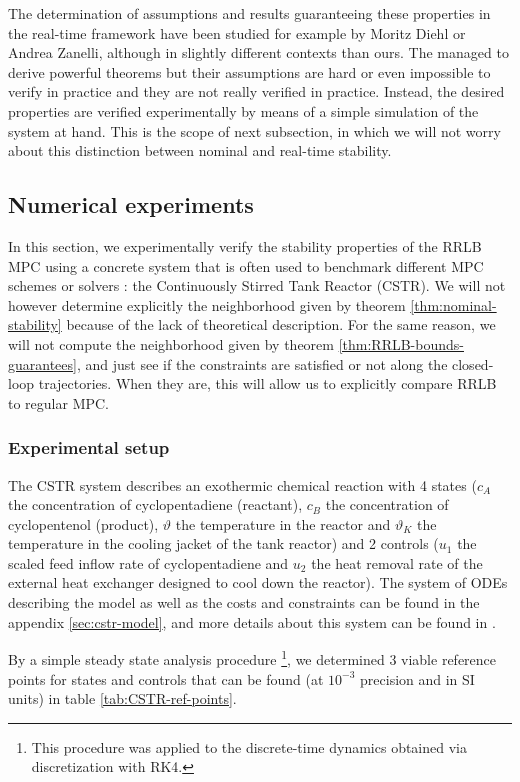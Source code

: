 \documentclass[12pt]{article}
\begin{document}
The determination of assumptions and results guaranteeing these properties in the real-time framework have been studied for example by Moritz Diehl or Andrea Zanelli, although in slightly different contexts than ours.
The managed to derive powerful theorems but their assumptions are hard or even impossible to verify in practice and they are not really verified in practice.
Instead, the desired properties are verified experimentally by means of a simple simulation of the system at hand.
This is the scope of next subsection, in which we will not worry about this distinction between nominal and real-time stability.


\subsection{Numerical experiments}\label{sec:RRLB-numerical-experiments}

In this section, we experimentally verify the stability properties of the RRLB MPC using a concrete system that is often used to benchmark different MPC schemes or solvers : the Continuously Stirred Tank Reactor (CSTR).
We will not however determine explicitly the neighborhood given by theorem \ref{thm:nominal-stability} because of the lack of theoretical description.
For the same reason, we will not compute the neighborhood given by theorem \ref{thm:RRLB-bounds-guarantees}, and just see if the constraints are satisfied or not along the closed-loop trajectories.
When they are, this will allow us to explicitly compare RRLB to regular MPC.

\subsubsection{Experimental setup}

The CSTR system describes an exothermic chemical reaction with 4 states ($c_A$ the concentration of cyclopentadiene (reactant), $c_B$ the concentration of cyclopentenol (product), $\vartheta$ the temperature in the reactor and $\vartheta_K$ the temperature in the cooling jacket of the tank reactor) and 2 controls ($u_1$ the scaled feed inflow rate of cyclopentadiene and $u_2$ the heat removal rate of the external heat exchanger designed to cool down the reactor).
The system of ODEs describing the model as well as the costs and constraints can be found in the appendix \ref{sec:cstr-model}, and more details about this system can be found in \cite{diehl-dissertation}.

By a simple steady state analysis procedure \footnote{This procedure was applied to the discrete-time dynamics obtained via discretization with RK4.}, we determined 3 viable reference points for states and controls that can be found (at $10^{-3}$ precision and in SI units) in table \ref{tab:CSTR-ref-points}.
\end{document}
